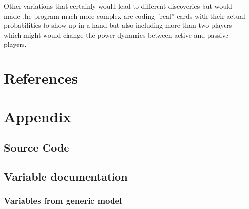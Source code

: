 \documentclass[11pt]{article}
\begin{document}
Other variations that certainly would lead to different discoveries but would made the program much more complex are coding ''real'' cards with their actual probabilities to show up in a hand but also including more than two players which might would change the power dynamics between active and passive players.


\section{References}

\section{Appendix}
\subsection{Source Code}
\subsection{Variable documentation}
\subsubsection{Variables from generic model}
\end{document}
